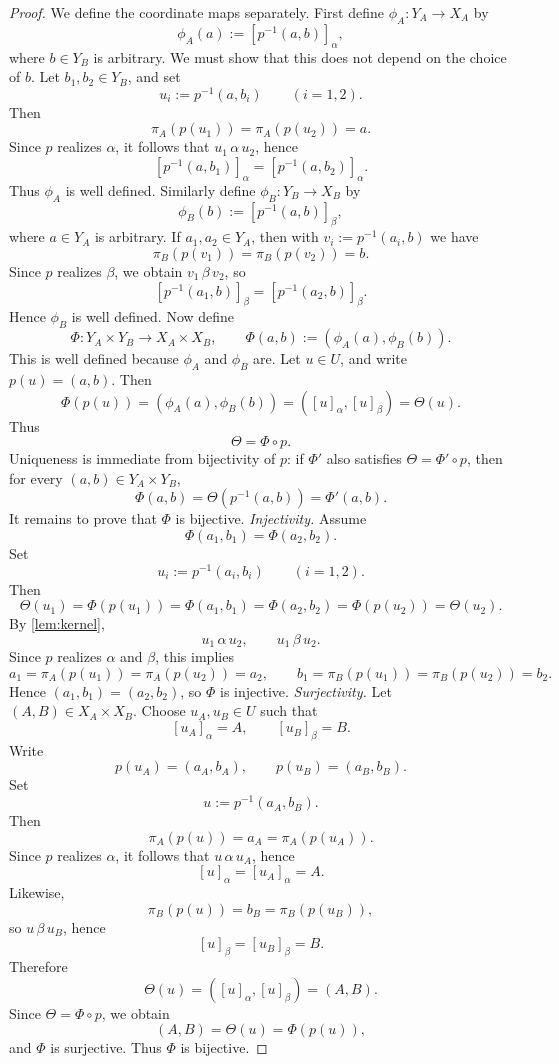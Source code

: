 \begin{proof}
	We define the coordinate maps separately.
	First define \(\phi_A:Y_A\to X_A\) by
	\[
		\phi_A(a):=[p^{-1}(a,b)]_\alpha,
	\]
	where \(b\in Y_B\) is arbitrary. We must show that this does not
	depend on the choice of \(b\). Let \(b_1,b_2\in Y_B\), and set
	\[
		u_i:=p^{-1}(a,b_i)\qquad (i=1,2).
	\]
	Then
	\[
		\pi_A(p(u_1))=\pi_A(p(u_2))=a.
	\]
	Since \(p\) realizes \(\alpha\), it follows that \(u_1\,\alpha\,u_2\),
	hence
	\[
		[p^{-1}(a,b_1)]_\alpha=[p^{-1}(a,b_2)]_\alpha.
	\]
	Thus \(\phi_A\) is well defined.
	Similarly define \(\phi_B:Y_B\to X_B\) by
	\[
		\phi_B(b):=[p^{-1}(a,b)]_\beta,
	\]
	where \(a\in Y_A\) is arbitrary. If \(a_1,a_2\in Y_A\), then with
	\(v_i:=p^{-1}(a_i,b)\) we have
	\[
		\pi_B(p(v_1))=\pi_B(p(v_2))=b.
	\]
	Since \(p\) realizes \(\beta\), we obtain \(v_1\,\beta\,v_2\), so
	\[
		[p^{-1}(a_1,b)]_\beta=[p^{-1}(a_2,b)]_\beta.
	\]
	Hence \(\phi_B\) is well defined.
	Now define
	\[
		\Phi:Y_A\times Y_B\to X_A\times X_B,
		\qquad
		\Phi(a,b):=(\phi_A(a),\phi_B(b)).
	\]
	This is well defined because \(\phi_A\) and \(\phi_B\) are.
	Let \(u\in U\), and write \(p(u)=(a,b)\). Then
	\[
		\Phi(p(u))
		=
		(\phi_A(a),\phi_B(b))
		=
		([u]_\alpha,[u]_\beta)
		=
		\Theta(u).
	\]
	Thus
	\[
		\Theta=\Phi\circ p.
	\]
	Uniqueness is immediate from bijectivity of \(p\): if \(\Phi'\) also
	satisfies \(\Theta=\Phi'\circ p\), then for every \((a,b)\in Y_A\times
	Y_B\),
	\[
		\Phi(a,b)=\Theta(p^{-1}(a,b))=\Phi'(a,b).
	\]
	It remains to prove that \(\Phi\) is bijective.
	\emph{Injectivity.}
	Assume
	\[
		\Phi(a_1,b_1)=\Phi(a_2,b_2).
	\]
	Set
	\[
		u_i:=p^{-1}(a_i,b_i)
		\qquad (i=1,2).
	\]
	Then
	\[
		\Theta(u_1)=\Phi(p(u_1))=\Phi(a_1,b_1)=\Phi(a_2,b_2)=\Phi(p(u_2))=\Theta(u_2).
	\]
	By \cref{lem:kernel},
	\[
		u_1\,\alpha\,u_2,
		\qquad
		u_1\,\beta\,u_2.
	\]
	Since \(p\) realizes \(\alpha\) and \(\beta\), this implies
	\[
		a_1=\pi_A(p(u_1))=\pi_A(p(u_2))=a_2,
		\qquad
		b_1=\pi_B(p(u_1))=\pi_B(p(u_2))=b_2.
	\]
	Hence \((a_1,b_1)=(a_2,b_2)\), so \(\Phi\) is injective.
	\emph{Surjectivity.}
	Let \((A,B)\in X_A\times X_B\). Choose \(u_A,u_B\in U\) such that
	\[
		[u_A]_\alpha=A,
		\qquad
		[u_B]_\beta=B.
	\]
	Write
	\[
		p(u_A)=(a_A,b_A),
		\qquad
		p(u_B)=(a_B,b_B).
	\]
	Set
	\[
		u:=p^{-1}(a_A,b_B).
	\]
	Then
	\[
		\pi_A(p(u))=a_A=\pi_A(p(u_A)).
	\]
	Since \(p\) realizes \(\alpha\), it follows that \(u\,\alpha\,u_A\),
	hence
	\[
		[u]_\alpha=[u_A]_\alpha=A.
	\]
	Likewise,
	\[
		\pi_B(p(u))=b_B=\pi_B(p(u_B)),
	\]
	so \(u\,\beta\,u_B\), hence
	\[
		[u]_\beta=[u_B]_\beta=B.
	\]
	Therefore
	\[
		\Theta(u)=([u]_\alpha,[u]_\beta)=(A,B).
	\]
	Since \(\Theta=\Phi\circ p\), we obtain
	\[
		(A,B)=\Theta(u)=\Phi(p(u)),
	\]
	and \(\Phi\) is surjective.
	Thus \(\Phi\) is bijective.
\end{proof}
